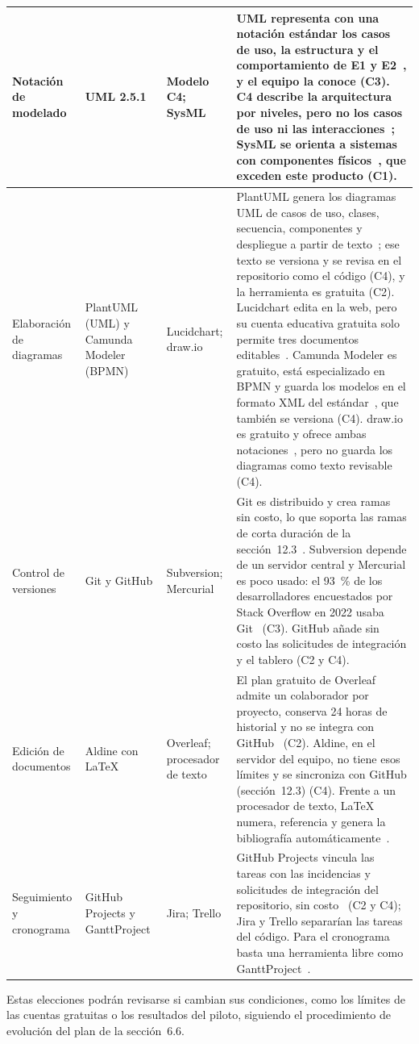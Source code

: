 \begin{longtable}{|p{}|p{}|p{}|p{}|}
\raggedright Notación de modelado & \raggedright UML 2.5.1 & \raggedright Modelo C4; SysML & \raggedright UML representa con una notación estándar los casos de uso, la estructura y el comportamiento de E1 y E2~\cite{uml}, y el equipo la conoce (C3). C4 describe la arquitectura por niveles, pero no los casos de uso ni las interacciones~\cite{brownc4}; SysML se orienta a sistemas con componentes físicos~\cite{omgsysml}, que exceden este producto (C1).\tabularnewline\hline
\raggedright Elaboración de diagramas & \raggedright PlantUML (UML) y Camunda Modeler (BPMN) & \raggedright Lucidchart; draw.io & \raggedright PlantUML genera los diagramas UML de casos de uso, clases, secuencia, componentes y despliegue a partir de texto~\cite{plantuml}; ese texto se versiona y se revisa en el repositorio como el código (C4), y la herramienta es gratuita (C2). Lucidchart edita en la web, pero su cuenta educativa gratuita solo permite tres documentos editables~\cite{lucidedu}. Camunda Modeler es gratuito, está especializado en BPMN y guarda los modelos en el formato XML del estándar~\cite{camundamodeler}, que también se versiona (C4). draw.io es gratuito y ofrece ambas notaciones~\cite{drawio}, pero no guarda los diagramas como texto revisable (C4).\tabularnewline\hline
\raggedright Control de versiones & \raggedright Git y GitHub & \raggedright Subversion; Mercurial & \raggedright Git es distribuido y crea ramas sin costo, lo que soporta las ramas de corta duración de la sección~12.3~\cite{chacon2014progit}. Subversion depende de un servidor central y Mercurial es poco usado: el 93~\% de los desarrolladores encuestados por Stack Overflow en 2022 usaba Git~\cite{donovan2023vcs} (C3). GitHub añade sin costo las solicitudes de integración y el tablero (C2 y C4).\tabularnewline\hline
\raggedright Edición de documentos & \raggedright Aldine con \LaTeX & \raggedright Overleaf; procesador de texto & \raggedright El plan gratuito de Overleaf admite un colaborador por proyecto, conserva 24 horas de historial y no se integra con GitHub~\cite{overleafplans} (C2). Aldine, en el servidor del equipo, no tiene esos límites y se sincroniza con GitHub (sección~12.3) (C4). Frente a un procesador de texto, \LaTeX{} numera, referencia y genera la bibliografía automáticamente~\cite{lamport1994latex}.\tabularnewline\hline
\raggedright Seguimiento y cronograma & \raggedright GitHub Projects y GanttProject & \raggedright Jira; Trello & \raggedright GitHub Projects vincula las tareas con las incidencias y solicitudes de integración del repositorio, sin costo~\cite{githubdocs} (C2 y C4); Jira y Trello separarían las tareas del código. Para el cronograma basta una herramienta libre como GanttProject~\cite{ganttproject}.\tabularnewline\hline
\end{longtable}

Estas elecciones podrán revisarse si cambian sus condiciones, como los límites de las cuentas gratuitas o los resultados del piloto, siguiendo el procedimiento de evolución del plan de la sección~6.6.

